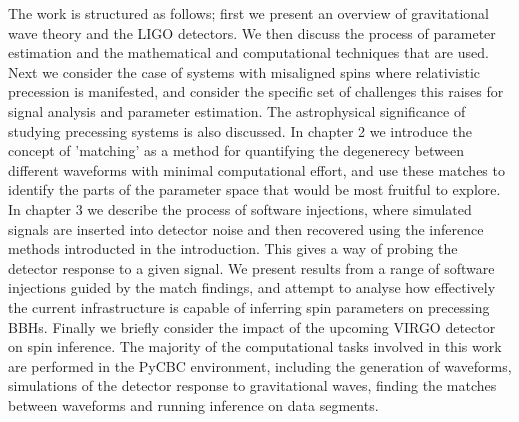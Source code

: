 \documentclass[11pt]{article}
\begin{document}
The work is structured as follows; first we present an overview of gravitational wave theory and the LIGO detectors. We then discuss the process of parameter estimation and the mathematical and computational techniques that are used. Next we consider the case of systems with misaligned spins where relativistic precession is manifested, and consider the specific set of challenges this raises for signal analysis and parameter estimation. The astrophysical significance of studying precessing systems is also discussed. In chapter 2 we introduce the concept of 'matching' as a method for quantifying the degenerecy between different waveforms with minimal computational effort, and use these matches to identify the parts of the parameter space that would be most fruitful to explore. In chapter 3 we describe the process of software injections, where simulated signals are inserted into detector noise and then recovered using the inference methods introducted in the introduction. This gives a way of probing the detector response to a given signal. We present results from a range of software injections guided by the match findings, and attempt to analyse how effectively the current infrastructure is capable of inferring spin parameters on precessing BBHs. Finally we briefly consider the impact of the upcoming VIRGO detector on spin inference. The majority of the computational tasks involved in this work are performed in the PyCBC environment\cite{pycbc}, including the generation of waveforms, simulations of the detector response to gravitational waves, finding the matches between waveforms and running inference on data segments.
\end{document}
